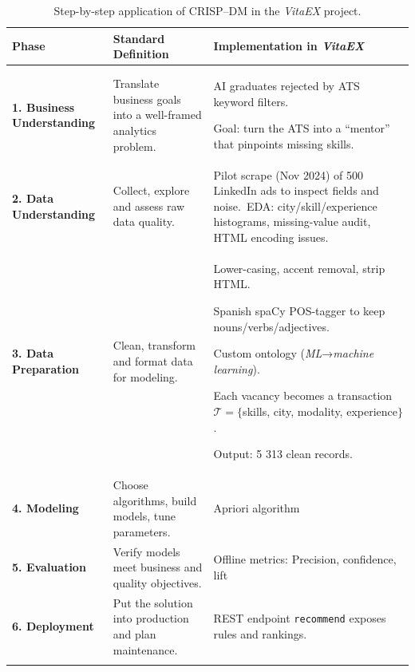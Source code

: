 \documentclass[runningheads]{llncs}
\begin{document}
\renewcommand{\arraystretch}{1.3}
\begin{longtable}{|>{\raggedright\arraybackslash}p{3.5cm}|p{4.6cm}|p{6.3cm}|}
	\hline
	\rowcolor{gray!20}\textbf{Phase} & \textbf{Standard Definition} & \textbf{Implementation in \emph{VitaEX}} \\ \hline
	\endhead
	\textbf{1. Business Understanding} &
	Translate business goals into a well-framed analytics problem. &
	AI graduates rejected by ATS keyword filters.\
	
	Goal: turn the ATS into a “mentor” that pinpoints missing skills.\
	
	\\ \hline
	
	\textbf{2. Data Understanding} &
	Collect, explore and assess raw data quality. &
	Pilot scrape (Nov 2024) of 500 LinkedIn ads to inspect fields and noise.\
	EDA: city/skill/experience histograms, missing-value audit, HTML encoding issues.\
	\\ \hline
	
	\textbf{3. Data Preparation} &
	Clean, transform and format data for modeling. &
	Lower-casing, accent removal, strip HTML.\
	
	Spanish spaCy POS-tagger to keep nouns/verbs/adjectives.\
	
	Custom ontology (\textit{ML}→\textit{machine learning}).\
	
	Each vacancy becomes a transaction $\mathcal{T}=\{$skills, city, modality, experience$\}$.\
	
	Output: 5 313 clean records. \\ \hline
	
	\textbf{4. Modeling} &
	Choose algorithms, build models, tune parameters. &
	Apriori algorithm \\ \hline
	
	\textbf{5. Evaluation} &
	Verify models meet business and quality objectives. &
	Offline metrics: Precision, confidence, lift
\\ \hline
	
	\textbf{6. Deployment} &
	Put the solution into production and plan maintenance. &
	REST endpoint \texttt{recommend} exposes rules and rankings.\
	
\\ \hline
	\caption{Step-by-step application of CRISP–DM in the \emph{VitaEX} project.}
	\label{tab:crispdm}
\end{longtable}


\end{document}
